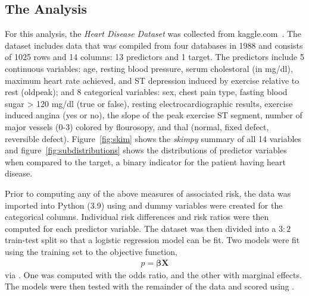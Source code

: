 \subsection{The Analysis}\label{subsec:analysis}

For this analysis, the \emph{Heart Disease Dataset} was collected from kaggle.com~\citep{Heart-disease-dataset}.
The dataset includes data that was compiled from four databases in 1988 and consists of 1025 rows and 14 columns: 13 predictors and 1 target.
The predictors include 5 continuous variables: age, resting blood pressure, serum cholestoral (in mg/dl), maximum heart rate achieved, and ST depression induced by exercise relative to rest (oldpeak);
and 8 categorical variables: sex, chest pain type, fasting blood sugar > 120 mg/dl (true or false), resting electrocardiographic results, exercise induced angina (yes or no), the slope of the peak exercise ST segment, number of major vessels (0-3) colored by flourosopy, and thal (normal, fixed defect, reversible defect).
Figure~\ref{fig:skim} shows the \emph{skimpy} summary of all 14 variables and figure~\ref{fig:subdistributions} shows the distributions of predictor variables when compared to the target, a binary indicator for the patient having heart disease.

Prior to computing any of the above measures of associated risk, the data was imported into Python (3.9) using  and dummy variables were created for the categorical columns.
Individual risk differences and risk ratios were then computed for each predictor variable.
The dataset was then divided into a $3:2$ train-test split so that a logistic regression model can be fit.
Two models were fit using the training set to the objective function,
\begin{align*}
    p = \boldsymbol{\beta X}
\end{align*}
via .
One was computed with the odds ratio, and the other with marginal effects.
The models were then tested with the remainder of the data and scored using .

